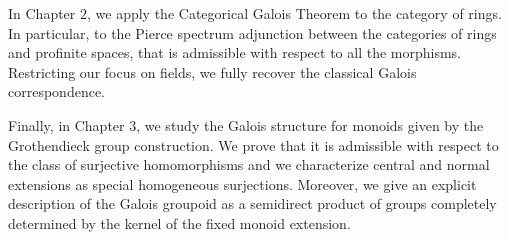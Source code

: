 \documentclass[11pt, a4paper]{article}
\theoremstyle{plain}
\theoremstyle{definition}
\begin{document}
\smallskip

In Chapter $2$, we apply the Categorical Galois Theorem to the category of rings. In particular, to the Pierce spectrum adjunction between the categories of rings and profinite spaces, that is admissible with respect to all the morphisms. Restricting our focus on fields, we fully recover the classical Galois correspondence.

\smallskip

Finally, in Chapter $3$, we study the Galois structure for monoids given by the Grothendieck group construction. We prove that it is admissible with respect to the class of surjective homomorphisms and we characterize central and normal extensions as special homogeneous surjections. Moreover, we give an explicit description of the Galois groupoid as a semidirect product of groups completely determined by the kernel of the fixed monoid extension.

\newpage 
\printbibliography
\end{document}
